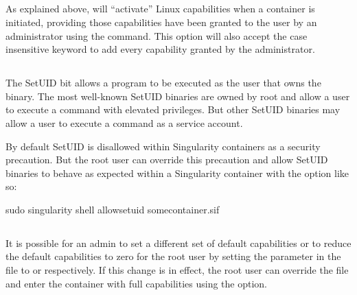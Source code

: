\documentclass[letterpaper,10pt,english]{sphinxmanual}
\begin{document}
\subsection{}
\label{\detokenize{security_options:add-caps}}
As explained above,  will “activate” Linux capabilities when a
container is initiated, providing those capabilities have been granted to the
user by an administrator using the  command. This option will
also accept the case insensitive keyword  to add every capability
granted by the administrator.


\subsection{}
\label{\detokenize{security_options:allow-setuid}}
The SetUID bit allows a program to be executed as the user that owns the binary.
The most well-known SetUID binaries are owned by root and allow a user to
execute a command with elevated privileges.  But other SetUID binaries may
allow a user to execute a command as a service account.

By default SetUID is disallowed within Singularity containers as a security
precaution.  But the root user can override this precaution and allow SetUID
binaries to behave as expected within a Singularity container with the
 option like so:

%
\begin{sphinxVerbatim}[commandchars=\\\{\}]
\PYGZdl{} sudo singularity shell \PYGZhy{}\PYGZhy{}allow\PYGZhy{}setuid some\PYGZus{}container.sif
\end{sphinxVerbatim}


\subsection{}
\label{\detokenize{security_options:keep-privs}}
It is possible for an admin to set a different set of default capabilities or to
reduce the default capabilities to zero for the root user by setting the  parameter in the  file to  or
 respectively.  If this change is in effect, the root user can override
the  file and enter the container with full capabilities
using the  option.
\end{document}
